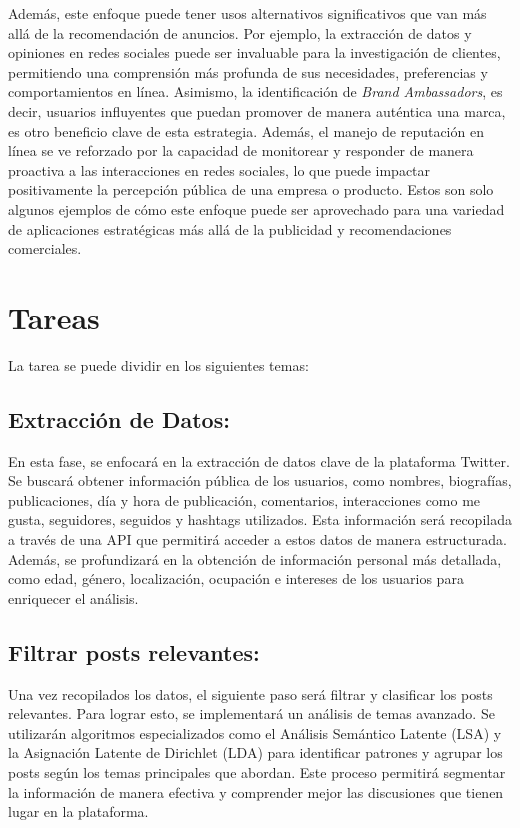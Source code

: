 \documentclass[
  letterpaper,
  DIV=11,
  numbers=noendperiod]{scrartcl}
\begin{document}
Además, este enfoque puede tener usos alternativos significativos que
van más allá de la recomendación de anuncios. Por ejemplo, la extracción
de datos y opiniones en redes sociales puede ser invaluable para la
investigación de clientes, permitiendo una comprensión más profunda de
sus necesidades, preferencias y comportamientos en línea. Asimismo, la
identificación de \emph{Brand Ambassadors}, es decir, usuarios
influyentes que puedan promover de manera auténtica una marca, es otro
beneficio clave de esta estrategia. Además, el manejo de reputación en
línea se ve reforzado por la capacidad de monitorear y responder de
manera proactiva a las interacciones en redes sociales, lo que puede
impactar positivamente la percepción pública de una empresa o producto.
Estos son solo algunos ejemplos de cómo este enfoque puede ser
aprovechado para una variedad de aplicaciones estratégicas más allá de
la publicidad y recomendaciones comerciales.

\section{Tareas}\label{tareas}

La tarea se puede dividir en los siguientes temas:

\subsection{Extracción de Datos:}\label{extracciuxf3n-de-datos}

En esta fase, se enfocará en la extracción de datos clave de la
plataforma Twitter. Se buscará obtener información pública de los
usuarios, como nombres, biografías, publicaciones, día y hora de
publicación, comentarios, interacciones como me gusta, seguidores,
seguidos y hashtags utilizados. Esta información será recopilada a
través de una API que permitirá acceder a estos datos de manera
estructurada. Además, se profundizará en la obtención de información
personal más detallada, como edad, género, localización, ocupación e
intereses de los usuarios para enriquecer el análisis.

\subsection{Filtrar posts relevantes:}\label{filtrar-posts-relevantes}

Una vez recopilados los datos, el siguiente paso será filtrar y
clasificar los posts relevantes. Para lograr esto, se implementará un
análisis de temas avanzado. Se utilizarán algoritmos especializados como
el Análisis Semántico Latente (LSA) y la Asignación Latente de Dirichlet
(LDA) para identificar patrones y agrupar los posts según los temas
principales que abordan. Este proceso permitirá segmentar la información
de manera efectiva y comprender mejor las discusiones que tienen lugar
en la plataforma.
\end{document}
